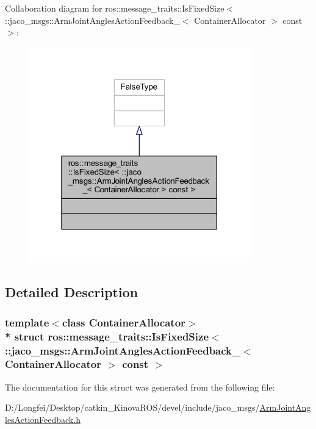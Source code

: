 Collaboration diagram for ros\+:\+:message\+\_\+traits\+:\+:Is\+Fixed\+Size$<$ \+:\+:jaco\+\_\+msgs\+:\+:Arm\+Joint\+Angles\+Action\+Feedback\+\_\+$<$ Container\+Allocator $>$ const $>$\+:
\nopagebreak
\begin{figure}[H]
\begin{center}
\leavevmode
\includegraphics[width=271pt]{d0/dab/structros_1_1message__traits_1_1IsFixedSize_3_01_1_1jaco__msgs_1_1ArmJointAnglesActionFeedback__6881d356d6522a487d19657756fee0e9}
\end{center}
\end{figure}


\subsection{Detailed Description}
\subsubsection*{template$<$class Container\+Allocator$>$\\*
struct ros\+::message\+\_\+traits\+::\+Is\+Fixed\+Size$<$ \+::jaco\+\_\+msgs\+::\+Arm\+Joint\+Angles\+Action\+Feedback\+\_\+$<$ Container\+Allocator $>$ const  $>$}



The documentation for this struct was generated from the following file\+:\begin{DoxyCompactItemize}
\item 
D\+:/\+Longfei/\+Desktop/catkin\+\_\+\+Kinova\+R\+O\+S/devel/include/jaco\+\_\+msgs/\hyperlink{ArmJointAnglesActionFeedback_8h}{Arm\+Joint\+Angles\+Action\+Feedback.\+h}\end{DoxyCompactItemize}
